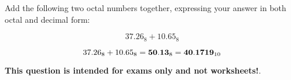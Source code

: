 

Add the following two octal numbers together, expressing your answer in both octal and decimal form:

$$37.26_8 + 10.65_8$$







$$37.26_8 + 10.65_8 = {\bf 50.13}_8 = {\bf 40.1719}_{10}$$







{\bf This question is intended for exams only and not worksheets!}.




